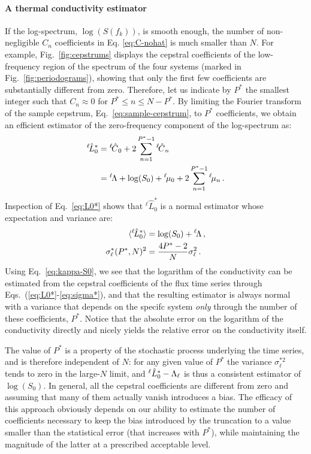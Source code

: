 \paragraph{A thermal conductivity estimator}
If the log-spectrum, $\log(S(f_k))$, is smooth enough, the number of non-negligible $C_n$ coefficients in Eq. \eqref{eq:C-nohat} is much smaller than $N$. 
For example, Fig.~\ref{fig:cepstrums} displays the cepstral coefficients of the low-frequency region of the spectrum of the four systems (marked in Fig.~\ref{fig:periodograms}), showing that only the first few coefficients are substantially different from zero. 
Therefore, let us indicate by $P^*$ the smallest integer such that $C_n \approx 0$ for $P^* \le n \le N-P^*$. By limiting the Fourier transform of the sample cepstrum, Eq.~\eqref{eq:sample-cepstrum}, to $P^*$ coefficients, we obtain an efficient estimator of the zero-frequency component of the log-spectrum as:
\begin{equation}
  \begin{aligned}
    ^{\ell\!}\hat{L}_{0}^{*} & = {^{\ell\!}\hat{C}}_{0} + 2 \sum_{n=1}^{P^{*}-1} {^{\ell\!}\hat{C}}_{n} \\
    & = {^{\ell\!}\rLambda} + \log(S_0) + {^{\ell\!} \mu_{0}} + 2 \sum_{n=1}^{P^*-1} {^{\ell\!}} \mu_{n} \,.
  \end{aligned} \label{eq:L0*}
\end{equation}
Inspection of Eq.~\eqref{eq:L0*} shows that $^{\ell\!}\hat{L}_{0}^{*}$ is a normal estimator whose expectation and variance are:
\begin{align}
	\langle {^{\ell\!}}\hat{L}_{0}^{*} \rangle &= \log(S_{0}) + {^{\ell\!}}\rLambda \,, \label{eq:L*} \\
	\sigma_\ell^{*}(P^{*},N)^{2} &= \frac{4P^{*}-2}{N} \sigma_{\ell}^{2} \,. \label{eq:sigma*}
\end{align}
Using Eq.~\eqref{eq:kappa-S0}, we see that the logarithm of the conductivity can be estimated from the cepstral coefficients of the flux time series through Eqs.~(\ref{eq:L0*}-\ref{eq:sigma*}), and that the resulting estimator is always normal with a variance that depends on the specifc system \emph{only} through the number of these coefficients, $P^*$. Notice that the absolute error on the logarithm of the conductivity directly and nicely yields the relative error on the conductivity itself.

The value of $P^{*}$ is a property of the stochastic process underlying the time series, and is therefore independent of $N$: for any given value of $P^{*}$ the variance $\sigma_{\ell}^{*2}$ tends to zero in the large-$N$ limit, and $^\ell\hat{L}^*_0-{\mathrm\Lambda}_{\ell}$ is thus a consistent estimator of $\log(S_{0})$. In general, all the cepstral coefficients are different from zero and assuming that many of them actually vanish introduces a bias. 
The efficacy of this approach obviously depends on our ability to estimate the number of coefficients necessary to keep the bias introduced by the truncation to a value smaller than the statistical error (that increases with $P^*$), while maintaining the magnitude of the latter at a prescribed acceptable level. 

